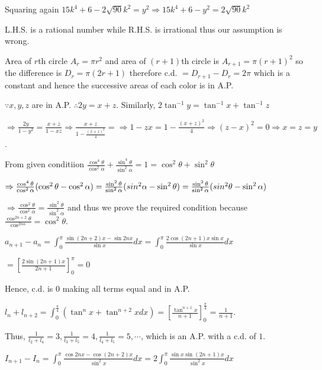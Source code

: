   Squaring again $15k^4 + 6 - 2\sqrt{90}k^2 = y^2 \Rightarrow 15k^4 + 6 - y^2 = 2\sqrt{90}k^2$

  L.H.S. is a rational number while R.H.S. is irrational thus our assumption is wrong.
\item Area of $r$th circle $A_r = \pi r^2$ and area of $(r + 1)$th circle is $A_{r + 1} = \pi(r + 1)^2$ so
  the difference is $D_r = \pi(2r + 1)$ therefore c.d. $= D_{r + 1} - D_r = 2\pi$ which is a constant and
  hence the successive areas of each color is in A.P.
\item $\because x, y, z$ are in A.P. $\therefore 2y = x + z$. Similarly, $2\tan^{-1}y = \tan^{-1}x +
  \tan^{-1}z$

  $\Rightarrow \frac{2y}{1 - y^2} = \frac{x + z}{1 - xz} \Rightarrow \frac{x + z}{1 - \frac{(x + z)^2}{4}} =
  \Rightarrow 1 - zx = 1 - \frac{(x + z)^2}{4} \Rightarrow (z - x)^2 = 0 \Rightarrow x = z = y$.
\item From given conditiion $\frac{\cos^4\theta}{\cos^2\alpha} + \frac{\sin^4\theta}{\sin^2\alpha} = 1 =
  \cos^2\theta + \sin^2\theta$

  $\Rightarrow \frac{\cos^4\theta}{\cos^2\alpha}(\cos^2\theta - \cos^2\alpha) =
  \frac{\sin^2\theta}{\sin^2\alpha}(\\sin^2\alpha - \sin^2\theta) =
  \frac{\sin^2\theta}{\sin^2\alpha}(\\sin^2\theta - \sin^2\alpha)$

  $\Rightarrow \frac{\cos^2\theta}{\cos^2\alpha} = \frac{\sin^2\theta}{\sin^2\alpha}$ and thus we prove the
  required condition because $\frac{\cos^{2n + 2}\theta}{\cos^{2n\alpha}} = \cos^2\theta$.
\item $a_{n + 1} - a_n = \displaystyle\int_0^\pi \frac{\sin(2n + 2)x - \sin2nx}{\sin x}dx = \int_0^\pi
  \frac{2\cos(2n + 1)x\sin x}{\sin x}dx$

  $= \left[\frac{2\sin(2n + 1)x}{2n + 1}\right]_0^\pi = 0$

  Hence, c.d. is $0$ making all terms equal and in A.P.
\item $l_n + l_{n + 2} = \displaystyle\int_{0}^{\tfrac{\pi}{4}}(\tan^nx + \tan^{n + 2}xdx) =
  \left[\frac{\tan^{n + 1}x}{n + 1}\right]_0^{\tfrac{\pi}{4}} = \frac{1}{n + 1}$.

  Thus, $\frac{1}{l_2 + l_4} = 3, \frac{1}{l_3 + l_5} = 4, \frac{1}{l_4 + l_5} = 5, \cdots$, which is an
  A.P. with a c.d. of $1$.
\item $I_{n + 1} - I_n = \displaystyle\int_{0}^\pi\frac{\cos 2nx - \cos(2n + 2)x}{\sin^2x}dx =
  2\int_{0}^\pi\frac{\sin x\sin(2n + 1)x}{\sin^2x}dx$

